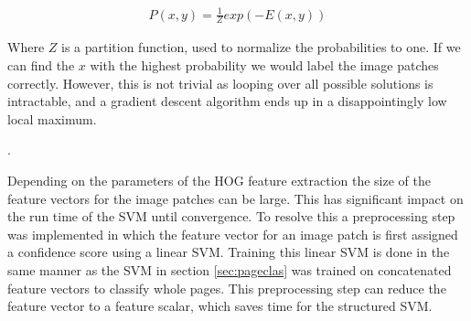 \begin{align}
P(x, y) = \frac{1}{Z} exp(-E(x, y))
\end{align}

Where $Z$ is a partition function, used to normalize the probabilities to one.
If we can find the $x$ with the highest probability we would label
the image patches correctly. However, this is not trivial as
looping over all possible solutions is intractable, and a gradient descent
algorithm ends up in a disappointingly low local maximum\cite{bishop2006pattern}.


 \cite{joachims2009cutting}.

Depending on the parameters of the HOG feature extraction the size of the
feature vectors for the image patches can be large. This has significant impact
on the run time of the SVM until convergence. To resolve this a preprocessing
step was implemented in which the feature vector for an image patch is first
assigned a confidence score using a linear SVM. Training this linear SVM is done
in the same manner as the SVM in section \ref{sec:pageclas} was trained on
concatenated feature vectors to classify whole pages. This preprocessing step
can reduce the feature vector to a feature scalar, which saves time for the
structured SVM.


